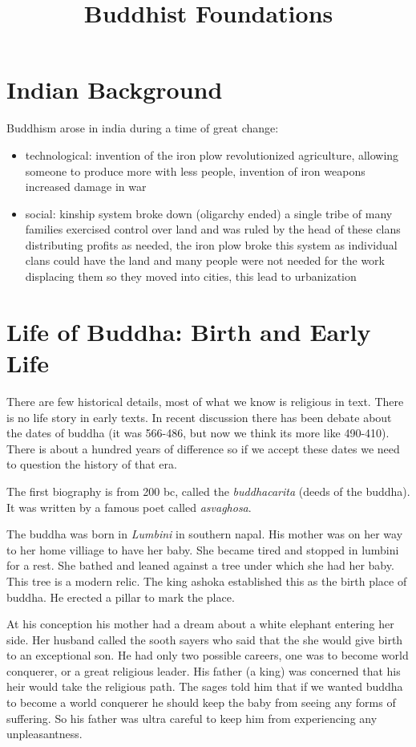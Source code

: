 \documentclass{article}
\begin{document}
\title{Buddhist Foundations}
\maketitle


\section*{Indian Background}
\label{sec:indian_background}
Buddhism arose in india during a time of great change:
\begin{itemize}
	\item technological: invention of the iron plow revolutionized agriculture, allowing someone to produce more with less people, invention of iron weapons increased damage in war
	\item social: kinship system broke down (oligarchy ended) a single tribe of many families exercised control over land and was ruled by the head of these clans distributing profits as needed, the iron plow broke this system as individual clans could have the land and many people were not needed for the work displacing them so they moved into cities, this lead to urbanization
\end{itemize}

\section*{Life of Buddha: Birth and Early Life}
\label{sec:life_of_buddha_birth_and_early_life}
There are few historical details, most of what we know is religious in text. There is no life story in early texts. In recent discussion there has been debate about the dates of buddha (it was 566-486, but now we think its more like 490-410). There is about a hundred years of difference so if we accept these dates we need to question the history of that era.

The first biography is from 200 bc, called the \emph{buddhacarita} (deeds of the buddha). It was written by a famous poet called \emph{asvaghosa}.

The buddha was born in \emph{Lumbini} in southern napal. His mother was on her way to her home villiage to have her baby. She became tired and stopped in lumbini for a rest. She bathed and leaned against a tree under which she had her baby. This tree is a modern relic. The king ashoka established this as the birth place of buddha. He erected a pillar to mark the place.

At his conception his mother had a dream about a white elephant entering her side. Her husband called the sooth sayers who said that the she would give birth to an exceptional son. He had only two possible careers, one was to become world conquerer, or a great religious leader. His father (a king) was concerned that his heir would take the religious path. The sages told him that if we wanted buddha to become a world conquerer he should keep the baby from seeing any forms of suffering. So his father was ultra careful to keep him from experiencing any unpleasantness.
\end{document}
